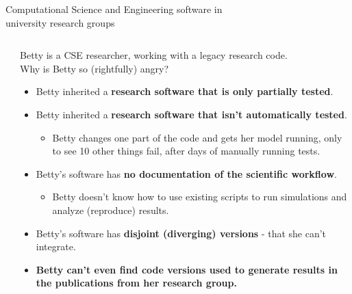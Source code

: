 \begin{frame}{Computational Science and Engineering software in\\university research groups}
\begin{columns}
\begin{column}[c]{0.2\textwidth}
        \end{column}
        \begin{column}[c]{0.8\textwidth}
            Betty is a CSE researcher, working with a legacy research code.\\
            Why is Betty so (rightfully) angry? 
            \begin{itemize}
                \item Betty inherited a \textbf{research software that is only partially tested}.
                \item Betty inherited a \textbf{research software that isn't automatically tested}.
                    \begin{itemize}
                        \item Betty changes one part of the code and gets her model running, only to see 10 other things fail, after days of manually running tests. 
                    \end{itemize}
                \item Betty's software has \textbf{no documentation of the scientific workflow}. 
                    \begin{itemize}
                        \item Betty doesn't know how to use existing scripts to run simulations and analyze (reproduce) results. 
                    \end{itemize}
                \item Betty's software has \textbf{disjoint (diverging) versions} - that she can't integrate. 
                \item \textbf{Betty can't even find code versions used to generate results in the publications from her research group.} 
            \end{itemize}
        \end{column}
    \end{columns}

\end{frame}

